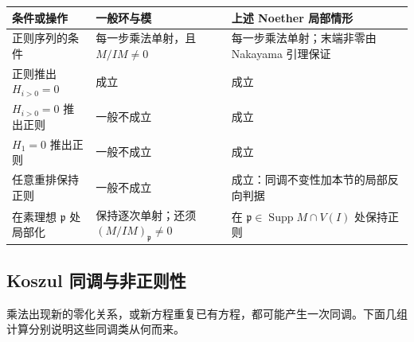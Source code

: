 \begin{center}
	\begin{minipage}{\textwidth}
		\makeatletter
		\def\@captype{table}
		\makeatother
		\centering
		\caption[正则序列与 Koszul 同调的假设和结论]{正则序列与 Koszul 同调的假设和结论。设 \(R\) 为交换环，\(M\ne0\) 为 \(R\) 模，\(x=(x_1,\ldots,x_r)\in R^r\)，\(I=(x_1,\ldots,x_r)\)。局部栏额外假设 \((R,\mathfrak m)\) 为 Noether 局部环、\(M\) 有限生成且全部 \(x_i\in\mathfrak m\)。局部化行假设原序列已经正则。}
		\label{b3:tab:koszul-hypotheses}
		\begin{tabularx}{\textwidth}{@{}>{\raggedright\arraybackslash}p{}>{\raggedright\arraybackslash}p{}>{\raggedright\arraybackslash}X@{}}
			\toprule
			条件或操作 & 一般环与模 & 上述 Noether 局部情形\\
			\midrule
			正则序列的条件 & 每一步乘法单射，且 \(M/IM\ne0\) & 每一步乘法单射；末端非零由 Nakayama 引理保证\\
			正则推出 \(H_{i>0}=0\) & 成立 & 成立\\
			\(H_{i>0}=0\) 推出正则 & 一般不成立 & 成立\\
			\(H_1=0\) 推出正则 & 一般不成立 & 成立\\
			任意重排保持正则 & 一般不成立 & 成立：同调不变性加本节的局部反向判据\\
			在素理想 \(\mathfrak p\) 处局部化 & 保持逐次单射；还须 \((M/IM)_{\mathfrak p}\ne0\) & 在 \(\mathfrak p\in\operatorname{Supp}M\cap V(I)\) 处保持正则\\
			\bottomrule
		\end{tabularx}
	\end{minipage}
\end{center}

\subsection{Koszul 同调与非正则性}
\label{b3:subsec:1503:03}

乘法出现新的零化关系，或新方程重复已有方程，都可能产生一次同调。下面几组计算分别说明这些同调类从何而来。

